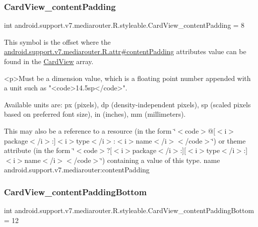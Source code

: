 \subsubsection{\texorpdfstring{Card\+View\+\_\+content\+Padding}{CardView\_contentPadding}}
{\footnotesize\ttfamily int android.\+support.\+v7.\+mediarouter.\+R.\+styleable.\+Card\+View\+\_\+content\+Padding = 8\hspace{0.3cm}{\ttfamily [static]}}

This symbol is the offset where the \hyperlink{classandroid_1_1support_1_1v7_1_1mediarouter_1_1R_1_1attr_af766688b56306f179e9dcdc4986c471d}{android.\+support.\+v7.\+mediarouter.\+R.\+attr\#content\+Padding} attribute\textquotesingle{}s value can be found in the \hyperlink{classandroid_1_1support_1_1v7_1_1mediarouter_1_1R_1_1styleable_a58720bc744e6374c25e81b8ae15a2c6a}{Card\+View} array.

\begin{DoxyVerb}      <p>Must be a dimension value, which is a floating point number appended with a unit such as "<code>14.5sp</code>".
\end{DoxyVerb}
 Available units are\+: px (pixels), dp (density-\/independent pixels), sp (scaled pixels based on preferred font size), in (inches), mm (millimeters). 

This may also be a reference to a resource (in the form \char`\"{}$<$code$>$@\mbox{[}$<$i$>$package$<$/i$>$\+:\mbox{]}$<$i$>$type$<$/i$>$\+:$<$i$>$name$<$/i$>$$<$/code$>$\char`\"{}) or theme attribute (in the form \char`\"{}$<$code$>$?\mbox{[}$<$i$>$package$<$/i$>$\+:\mbox{]}\mbox{[}$<$i$>$type$<$/i$>$\+:\mbox{]}$<$i$>$name$<$/i$>$$<$/code$>$\char`\"{}) containing a value of this type.  name android.\+support.\+v7.\+mediarouter\+:content\+Padding \mbox{\label{classandroid_1_1support_1_1v7_1_1mediarouter_1_1R_1_1styleable_a777878e2a53c120829fa76dfd7786c17}} 
\subsubsection{\texorpdfstring{Card\+View\+\_\+content\+Padding\+Bottom}{CardView\_contentPaddingBottom}}
{\footnotesize\ttfamily int android.\+support.\+v7.\+mediarouter.\+R.\+styleable.\+Card\+View\+\_\+content\+Padding\+Bottom = 12\hspace{0.3cm}{\ttfamily [static]}}

